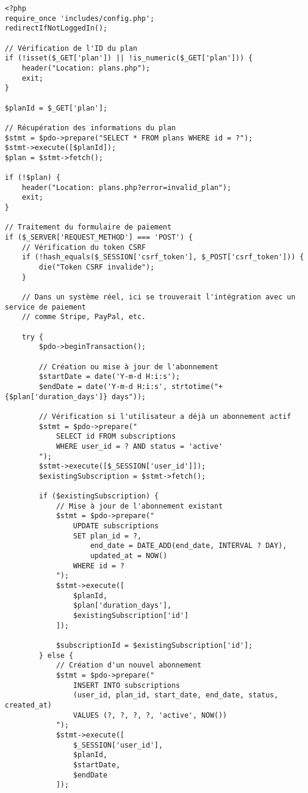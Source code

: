 \documentclass[12pt,a4paper]{report}
\begin{document}
\begin{lstlisting}[style=phpStyle, caption=Extrait de payment.php - Traitement des paiements]
<?php
require_once 'includes/config.php';
redirectIfNotLoggedIn();

// Vérification de l'ID du plan
if (!isset($_GET['plan']) || !is_numeric($_GET['plan'])) {
    header("Location: plans.php");
    exit;
}

$planId = $_GET['plan'];

// Récupération des informations du plan
$stmt = $pdo->prepare("SELECT * FROM plans WHERE id = ?");
$stmt->execute([$planId]);
$plan = $stmt->fetch();

if (!$plan) {
    header("Location: plans.php?error=invalid_plan");
    exit;
}

// Traitement du formulaire de paiement
if ($_SERVER['REQUEST_METHOD'] === 'POST') {
    // Vérification du token CSRF
    if (!hash_equals($_SESSION['csrf_token'], $_POST['csrf_token'])) {
        die("Token CSRF invalide");
    }
    
    // Dans un système réel, ici se trouverait l'intégration avec un service de paiement
    // comme Stripe, PayPal, etc.
    
    try {
        $pdo->beginTransaction();
        
        // Création ou mise à jour de l'abonnement
        $startDate = date('Y-m-d H:i:s');
        $endDate = date('Y-m-d H:i:s', strtotime("+{$plan['duration_days']} days"));
        
        // Vérification si l'utilisateur a déjà un abonnement actif
        $stmt = $pdo->prepare("
            SELECT id FROM subscriptions 
            WHERE user_id = ? AND status = 'active'
        ");
        $stmt->execute([$_SESSION['user_id']]);
        $existingSubscription = $stmt->fetch();
        
        if ($existingSubscription) {
            // Mise à jour de l'abonnement existant
            $stmt = $pdo->prepare("
                UPDATE subscriptions 
                SET plan_id = ?,
                    end_date = DATE_ADD(end_date, INTERVAL ? DAY),
                    updated_at = NOW()
                WHERE id = ?
            ");
            $stmt->execute([
                $planId,
                $plan['duration_days'],
                $existingSubscription['id']
            ]);
            
            $subscriptionId = $existingSubscription['id'];
        } else {
            // Création d'un nouvel abonnement
            $stmt = $pdo->prepare("
                INSERT INTO subscriptions 
                (user_id, plan_id, start_date, end_date, status, created_at)
                VALUES (?, ?, ?, ?, 'active', NOW())
            ");
            $stmt->execute([
                $_SESSION['user_id'],
                $planId,
                $startDate,
                $endDate
            ]);
            

\end{lstlisting}
\end{document}
